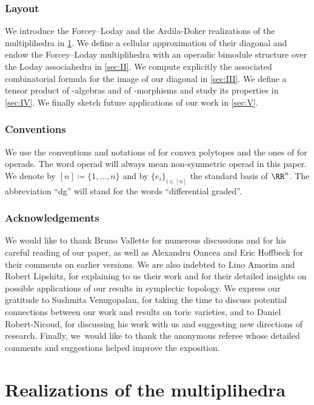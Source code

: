 \documentclass[JEP,XML,SOM,NoFloatCountersInSection,Unicode,published]{cedram}
\theoremstyle{definition}
\theoremstyle{plain}
\begin{document}
\subsubsection*{Layout}
We introduce the Forcey--Loday and the Ardila-Doker realizations of the multiplihedra in \cref{sec:I}.
We define a cellular approximation of their diagonal and endow the Forcey--Loday multiplihedra with an operadic bimodule structure over the Loday associahedra in \cref{sec:II}.
We compute explicitly the associated combinatorial formula for the image of our diagonal in \cref{sec:III}.
We define a tensor product of \Ainf -algebras and of \Ainf -morphisms and study its properties in \cref{sec:IV}.
We finally sketch future applications of our work in \cref{sec:V}.

\subsubsection*{Conventions}
We use the conventions and notations of \cite{Ziegler95} for convex polytopes and the ones of \cite{LodayVallette12} for operads.
The word operad will always mean non-symmetric operad \cite[\S 5.2.8]{LodayVallette12} in this paper.
We denote by $[n]\coloneqq \{1,\ldots,n\}$ and by $\{ e_i\}_{i \in [n]}$ the standard basis of $\RR^n$.
The abbreviation ``dg'' will stand for the words ``differential graded''.

\subsubsection*{Acknowledgements}
We would like to thank Bruno Vallette for numerous discussions and for his careful reading of our paper, as well as Alexandru Oancea and Eric Hoffbeck for their comments on earlier versions.
We are also indebted to Lino Amorim and Robert Lipshitz, for explaining to us their work and for their detailed insights on possible applications of our results in symplectic topology.
We express our gratitude to Sushmita Venugopalan, for taking the time to discuss potential connections between our work and results on toric varieties, and to Daniel Robert-Nicoud, for discussing his work with us and suggesting new directions of research.
Finally, we~would like to thank the anonymous referee whose detailed comments and suggestions helped improve the exposition.

\section{Realizations of the multiplihedra}
\label{sec:I}
\end{document}
